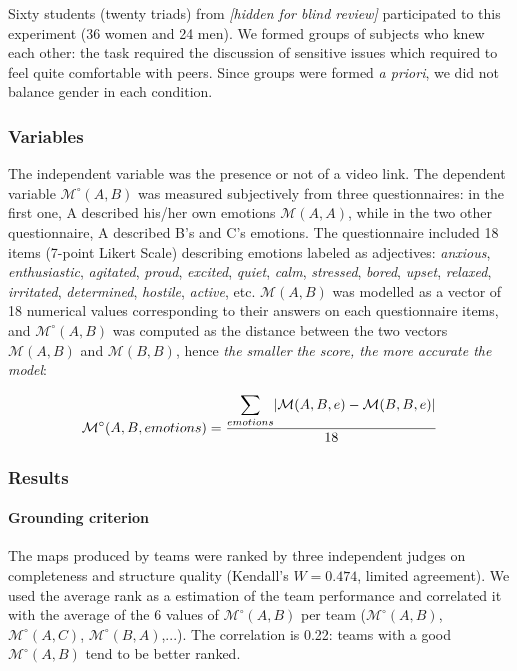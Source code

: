 \documentclass[natbib]{svjour3}
\newcommand{\A}{A\xspace}
\newcommand{\B}{B\xspace}
\newcommand{\C}{C\xspace}
\newcommand{\M}[3]{{\mathcal{M}(#1, #2, #3)}}
\newcommand{\gmodel}[2]{{$\mathcal{M}(#1, #2)$}}
\newcommand{\gModel}[2]{{$\mathcal{M}^{\circ}(#1, #2)$}}
\newcommand{\Mdeg}[3]{{\mathcal{M}^{\circ}(#1, #2, #3)}}
\DeclarePairedDelimiter\abs{\lvert}{\rvert}%
\begin{document}
Sixty students (twenty triads) from \textit{[hidden for blind review]} participated to
this experiment (36 women and 24 men). We formed groups of subjects who knew
each other: the task required the discussion of sensitive issues which required
to feel quite comfortable with peers. Since groups were formed \textit{a
priori}, we did not balance gender in each condition.

\subsubsection*{Variables}

The independent variable was the presence or not of a video link. The dependent
variable \gModel{A}{B} was measured subjectively from three questionnaires: in
the first one, \A described his/her own emotions \gmodel{A}{A}, while in the
two other questionnaire, \A described \B's and \C's emotions. The questionnaire
included 18 items (7-point Likert Scale) describing emotions labeled as
adjectives: \emph{anxious}, \emph{enthusiastic}, \emph{agitated}, \emph{proud},
\emph{excited}, \emph{quiet}, \emph{calm}, \emph{stressed}, \emph{bored},
\emph{upset}, \emph{relaxed}, \emph{irritated}, \emph{determined},
\emph{hostile}, \emph{active}, etc. \gmodel{A}{B} was modelled as a vector of 18
numerical values corresponding to their answers on each questionnaire items, and
\gModel{A}{B} was computed as the distance between the two vectors
\gmodel{A}{B} and \gmodel{B}{B}, hence \emph{the smaller the score, the more
accurate the model}:

\[
    \Mdeg{A}{B}{emotions} = \frac{\displaystyle\sum_{emotions} \abs{\M{A}{B}{e} -
    \M{B}{B}{e}}}{18}
\]


\subsubsection*{Results}

\paragraph{Grounding criterion} The maps produced by teams were ranked by three
independent judges on completeness and structure quality (Kendall's $W=0.474$,
limited agreement). We used the average rank as a estimation of the team
performance and correlated it with the average of the 6 values of \gModel{A}{B}
per team (\gModel{A}{B}, \gModel{A}{C}, \gModel{B}{A},...). The correlation is
0.22: teams with a good \gModel{A}{B} tend to be better ranked. 
\end{document}
